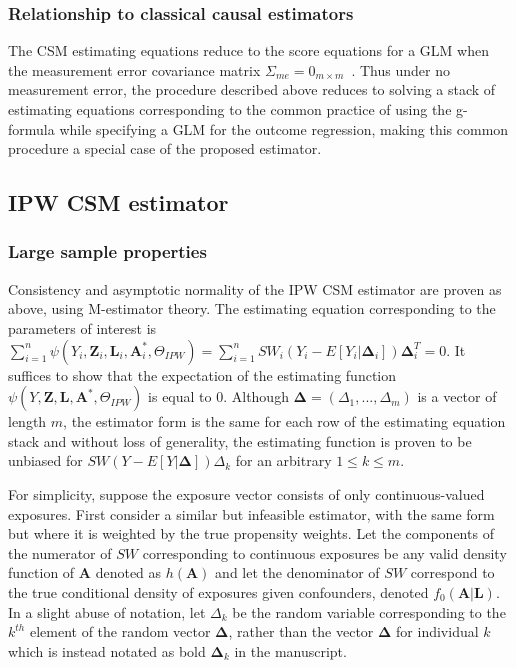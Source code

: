 \documentclass[12pt]{article}
\begin{document}
\subsubsection{Relationship to classical causal estimators}

The CSM estimating equations reduce to the score equations for a GLM when the measurement error covariance matrix $\Sigma_{me} = 0_{m \times m}$~\citep{carroll2006}. Thus under no measurement error, the procedure described above reduces to solving a stack of estimating equations corresponding to the common practice of using the g-formula while specifying a GLM for the outcome regression, making this common procedure a special case of the proposed estimator.

\subsection{IPW CSM estimator}

\subsubsection{Large sample properties}

Consistency and asymptotic normality of the IPW CSM estimator are proven as above, using M-estimator theory. The estimating equation corresponding to the parameters of interest is $\sum_{i=1}^{n} \psi(Y_{i}, \bm{Z}_{i}, \bm{L}_{i}, \bm{A}^{*}_{i}, \Theta_{IPW}) = \sum_{i=1}^{n} SW_{i}(Y_{i} - E[Y_{i} | \bm{\Delta}_{i}])\bm{\Delta}_{i}^{T} = 0$. It suffices to show that the expectation of the estimating function $\psi(Y, \bm{Z}, \bm{L}, \bm{A}^{*}, \Theta_{IPW})$ is equal to 0. Although $\bm{\Delta} = (\Delta_{1}, ..., \Delta_{m})$ is a vector of length $m$, the estimator form is the same for each row of the estimating equation stack and without loss of generality, the estimating function is proven to be unbiased for $SW(Y - E[Y | \bm{\Delta}])\Delta_{k}$ for an arbitrary $1 \leq k \leq m$.

For simplicity, suppose the exposure vector consists of only continuous-valued exposures. First consider a similar but infeasible estimator, with the same form but where it is weighted by the true propensity weights. Let the components of the numerator of $SW$ corresponding to continuous exposures be any valid density function of $\bm{A}$ denoted as $h(\bm{A})$ and let the denominator of $SW$ correspond to the true conditional density of exposures given confounders, denoted $f_{0}(\bm{A} | \bm{L})$. In a slight abuse of notation, let $\Delta_{k}$ be the random variable corresponding to the $k^{th}$ element of the random vector $\bm{\Delta}$, rather than the vector $\bm{\Delta}$ for individual $k$ which is instead notated as bold $\bm{\Delta}_{k}$ in the manuscript.
\end{document}
